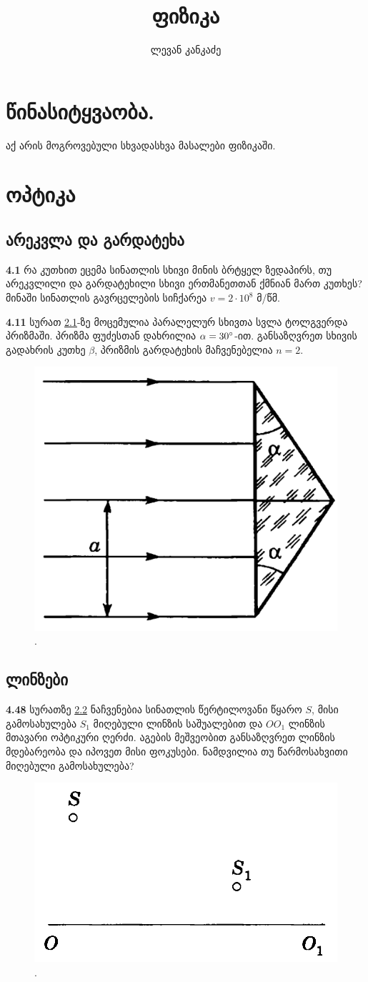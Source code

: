 \documentclass[a4paper]{book}
\title{ფიზიკა}
\author{ლევან კანკაძე}
\begin{document}
\maketitle

\tableofcontents

\chapter{წინასიტყვაობა.}
აქ არის მოგროვებული სხვადასხვა მასალები ფიზიკაში.


\chapter{ოპტიკა}
\section{არეკვლა და გარდატეხა}
\qquad \textbf{4.1} რა კუთხით ეცემა სინათლის სხივი მინის ბრტყელ ზედაპირს, თუ არეკვლილი და გარდატეხილი სხივი ერთმანეთთან ქმნიან მართ კუთხეს? მინაში სინათლის გავრცელების სიჩქარეა $v = 2 \cdot 10^8$ მ/წმ.

\textbf{4.11} სურათ \ref{fig:4_11}-ზე მოცემულია პარალელურ სხივთა სვლა ტოლგვერდა პრიზმაში. პრიზმა ფუძესთან დახრილია $\alpha = 30 \degree$-ით. განსაზღვრეთ სხივის გადახრის კუთხე $\beta$, პრიზმის გარდატეხის მაჩვენებელია $n = 2$.
		\begin{figure}[h]
		   \centering
           \includegraphics[width=0.4\columnwidth]{figures/4_11}
           \caption{.}
           \label{fig:4_11}
        \end{figure}

\section{ლინზები}

\textbf{4.48} სურათზე \ref{fig:4_48} ნაჩვენებია სინათლის წერტილოვანი წყარო $S$, მისი გამოსახულება $S_1$ მიღებული ლინზის საშუალებით და $OO_1$ ლინზის მთავარი ოპტიკური ღერძი. აგების მეშვეობით განსაზღვრეთ ლინზის მდებარეობა და იპოვეთ მისი ფოკუსები. ნამდვილია თუ წარმოსახვითი მიღებული გამოსახულება?
		\begin{figure}[h]
		   \centering
           \includegraphics[width=0.4\columnwidth]{figures/4_48}
           \caption{.}
           \label{fig:4_48}
        \end{figure}
\end{document}
